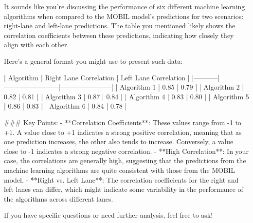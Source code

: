 It sounds like you're discussing the performance of six different machine learning algorithms when compared to the MOBIL model's predictions for two scenarios: right-lane and left-lane predictions. The table you mentioned likely shows the correlation coefficients between these predictions, indicating how closely they align with each other.

Here’s a general format you might use to present such data:

| Algorithm | Right Lane Correlation | Left Lane Correlation |
|-----------|------------------------|-----------------------|
| Algorithm 1 | 0.85                   | 0.79                  |
| Algorithm 2 | 0.82                   | 0.81                  |
| Algorithm 3 | 0.87                   | 0.84                  |
| Algorithm 4 | 0.83                   | 0.80                  |
| Algorithm 5 | 0.86                   | 0.83                  |
| Algorithm 6 | 0.84                   | 0.78                  |

### Key Points:
- **Correlation Coefficients**: These values range from -1 to +1. A value close to +1 indicates a strong positive correlation, meaning that as one prediction increases, the other also tends to increase. Conversely, a value close to -1 indicates a strong negative correlation.
- **High Correlation**: In your case, the correlations are generally high, suggesting that the predictions from the machine learning algorithms are quite consistent with those from the MOBIL model.
- **Right vs. Left Lane**: The correlation coefficients for the right and left lanes can differ, which might indicate some variability in the performance of the algorithms across different lanes.

If you have specific questions or need further analysis, feel free to ask!